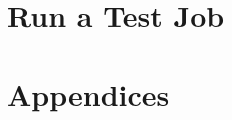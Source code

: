 \documentclass[letterpaper]{article}
\begin{document}
\clearpage
\section{Run a Test Job} \label{sec:test_job}


\clearpage
\appendix
\section*{Appendices}
\renewcommand{\thesubsection}{\Alph{subsection}}




\end{document}
